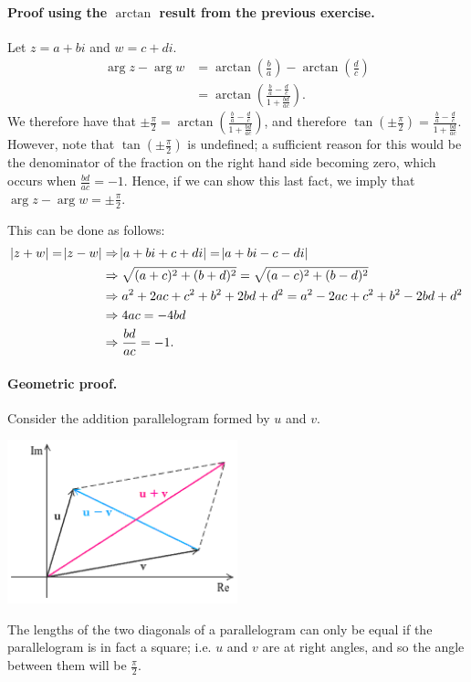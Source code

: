 \documentclass[a4paper,10pt]{article}
\DeclareMathOperator{\carg}{arg}
\begin{document}
\paragraph{Proof using the $ \arctan $ result from the previous exercise.}
Let $ z = a+bi $ and $ w = c+di $.
\begin{align*}
  \carg z - \carg w &= \arctan \left( \frac{b}{a} \right) - \arctan \left( \frac{d}{c} \right)\\
                    &= \arctan \left( \frac{\frac{b}{a} - \frac{d}{c}}{1+ \frac{bd}{ac}} \right).
\end{align*}
We therefore have that $ \pm \frac{\pi}{2} = \arctan \left( \frac{\frac{b}{a} - \frac{d}{c}}{1+ \frac{bd}{ac}} \right) $,
and therefore $ \tan \left( \pm \frac{\pi}{2} \right) = \frac{\frac{b}{a} - \frac{d}{c}}{1+ \frac{bd}{ac}} $. However, note that
$ \tan \left( \pm \frac{\pi}{2} \right) $ is undefined; a sufficient reason for this would be the denominator of the fraction on the
right hand side becoming zero, which occurs when $ \frac{bd}{ac} = -1 $. Hence, if we can show this last fact, we
imply that $ \carg z - \carg w = \pm \frac{\pi}{2} $.

This can be done as follows:
\begin{align*}
  \abs{z + w} = \abs{z - w} &\Rightarrow \abs{a + bi + c + di} = \abs{a + bi - c - di}\\
                            &\Rightarrow \sqrt{(a+c)^2 + (b+d)^2} = \sqrt{(a-c)^2 + (b-d)^2}\\
                            &\Rightarrow a^2 + 2ac + c^2 + b^2 + 2bd + d^2 = a^2 - 2ac + c^2 + b^2 - 2bd + d^2\\
                            &\Rightarrow 4ac = -4bd\\
                            &\Rightarrow \frac{bd}{ac} = -1.
\end{align*}

\paragraph{Geometric proof.}
Consider the addition parallelogram formed by $ u $ and $ v $.
\begin{center}
  \includegraphics[width=0.5\textwidth]{vecadd}\\
\end{center}
The lengths of the two diagonals of a parallelogram can only be equal
if the parallelogram is in fact a square; i.e. $ u $ and $ v $ are at
right angles, and so the angle between them will be $ \frac{\pi}{2} $.
\end{document}
